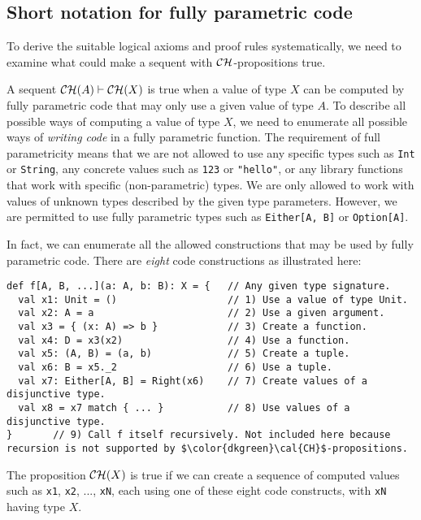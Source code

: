 \subsection{Short notation for fully parametric code\label{subsec:Short-notation-for-eight-code-constructions}}

To derive the suitable logical axioms and proof rules systematically,
we need to examine what could make a sequent with ${\cal CH}$-propositions
true.

A sequent ${\cal CH}(A)\vdash{\cal CH}(X)$ is true when a value of
type $X$ can be computed by fully parametric code that may only use
a given value of type $A$. To describe all possible ways of computing
a value of type $X$, we need to enumerate all possible ways of \emph{writing
code} in a fully parametric function. The requirement of full parametricity
means that we are not allowed to use any specific types such as \lstinline!Int!
or \lstinline!String!, any concrete values such as \lstinline!123!
or \lstinline!"hello"!, or any library functions that work with specific
(non-parametric) types. We are only allowed to work with values of
unknown types described by the given type parameters. However, we
are permitted to use fully parametric types such as \lstinline!Either[A, B]!
or \lstinline!Option[A]!. 

In fact, we can enumerate all the allowed constructions that may be
used by fully parametric code. There are \emph{eight} code constructions
as illustrated here:
\begin{lstlisting}[mathescape=true]
def f[A, B, ...](a: A, b: B): X = {   // Any given type signature.
  val x1: Unit = ()                   // 1) Use a value of type Unit.
  val x2: A = a                       // 2) Use a given argument.
  val x3 = { (x: A) => b }            // 3) Create a function.
  val x4: D = x3(x2)                  // 4) Use a function.
  val x5: (A, B) = (a, b)             // 5) Create a tuple.
  val x6: B = x5._2                   // 6) Use a tuple.
  val x7: Either[A, B] = Right(x6)    // 7) Create values of a disjunctive type.
  val x8 = x7 match { ... }           // 8) Use values of a disjunctive type.
}       // 9) Call f itself recursively. Not included here because recursion is not supported by $\color{dkgreen}\cal{CH}$-propositions.
\end{lstlisting}
The proposition ${\cal CH}(X)$ is true if we can create a sequence
of computed values such as \lstinline!x1!, \lstinline!x2!, ...,
\lstinline!xN!, each using one of these eight code constructs, with
\lstinline!xN! having type $X$. 

